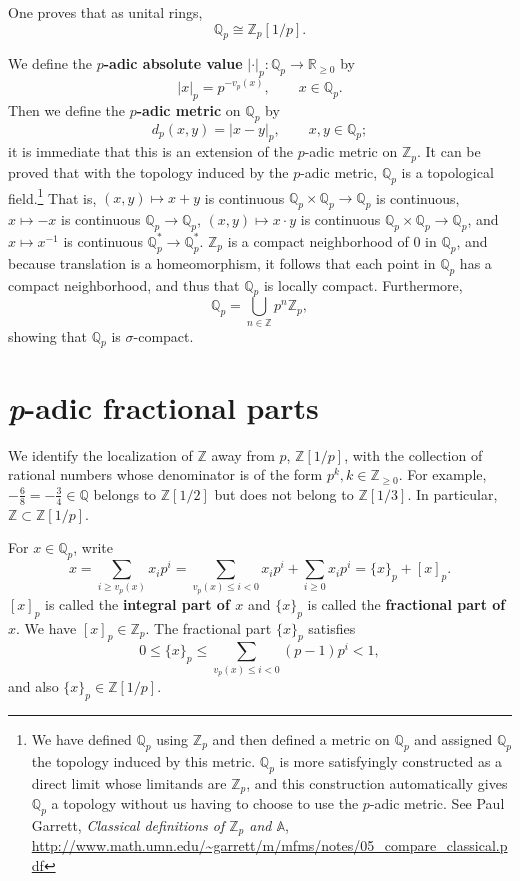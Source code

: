 \documentclass{article}
\theoremstyle{definition}
\theoremstyle{definition}
\begin{document}
One proves that as unital rings,
\[
\mathbb{Q}_p \cong \mathbb{Z}_p[1/p].
\]

We define the \textbf{$p$-adic absolute value} $|\cdot|_p:\mathbb{Q}_p \to \mathbb{R}_{\geq 0}$ by
\[
|x|_p = p^{-v_p(x)}, \qquad x \in \mathbb{Q}_p.
\]
Then we define the \textbf{$p$-adic metric} on $\mathbb{Q}_p$ by
\[
d_p(x,y) = |x-y|_p, \qquad x,y \in \mathbb{Q}_p;
\]
it is immediate that this is an extension of the $p$-adic metric on $\mathbb{Z}_p$. 
It can be proved that with the topology induced by the $p$-adic metric, $\mathbb{Q}_p$ is a topological field.\footnote{We have defined $\mathbb{Q}_p$ using $\mathbb{Z}_p$ and then
defined a metric on $\mathbb{Q}_p$ and assigned $\mathbb{Q}_p$ the topology induced by this metric. $\mathbb{Q}_p$ is more satisfyingly 
constructed as a direct limit whose limitands are $\mathbb{Z}_p$, 
and this construction automatically gives $\mathbb{Q}_p$ a topology without us having to choose to use the $p$-adic metric. See Paul Garrett,
{\em Classical definitions of $\mathbb{Z}_p$ and $\mathbb{A}$},
\url{http://www.math.umn.edu/~garrett/m/mfms/notes/05_compare_classical.pdf}}
 That is,
$(x,y) \mapsto x+y$ is continuous $\mathbb{Q}_p \times
\mathbb{Q}_p \to \mathbb{Q}_p$ is continuous, $x \mapsto -x$ is continuous $\mathbb{Q}_p \to \mathbb{Q}_p$, 
$(x,y) \mapsto x\cdot y$ is continuous $\mathbb{Q}_p \times \mathbb{Q}_p \to \mathbb{Q}_p$, and
$x \mapsto x^{-1}$ is continuous $\mathbb{Q}_p^* \to \mathbb{Q}_p^*$. 
$\mathbb{Z}_p$ is a compact neighborhood of $0$ in $\mathbb{Q}_p$, and because translation is a homeomorphism, it follows that
each point in $\mathbb{Q}_p$ has a compact neighborhood, and thus that $\mathbb{Q}_p$ is locally compact. Furthermore,
\[
\mathbb{Q}_p = \bigcup_{n \in \mathbb{Z}} p^n \mathbb{Z}_p,
\]
showing that $\mathbb{Q}_p$ is $\sigma$-compact.


\section{{\em p}-adic fractional parts}
We identify the localization of $\mathbb{Z}$ away from $p$, $\mathbb{Z}[1/p]$, with the collection of rational numbers whose denominator is of
the form $p^k, k \in \mathbb{Z}_{\geq 0}$. For example, $-\frac{6}{8} = -\frac{3}{4} \in \mathbb{Q}$ belongs to
$\mathbb{Z}[1/2]$ but does not belong to $\mathbb{Z}[1/3]$. In particular, $\mathbb{Z} \subset \mathbb{Z}[1/p]$. 

For $x \in \mathbb{Q}_p$, write
\[
x=\sum_{i \geq v_p(x)} x_i p^i = \sum_{v_p(x) \leq i < 0} x_i p^i + \sum_{i \geq 0} x_i p^i = \{x\}_p+[x]_p.
\]
$[x]_p$ is called the \textbf{integral part of $x$} and $\{x\}_p$ is called the \textbf{fractional part of $x$}.
We have $[x]_p \in \mathbb{Z}_p$. The fractional part $\{x\}_p$ satisfies
\[
0 \leq \{x\}_p \leq \sum_{v_p(x) \leq i<0} (p-1)p^i <1,
\]
and also $\{x\}_p \in \mathbb{Z}[1/p]$. 
\end{document}
